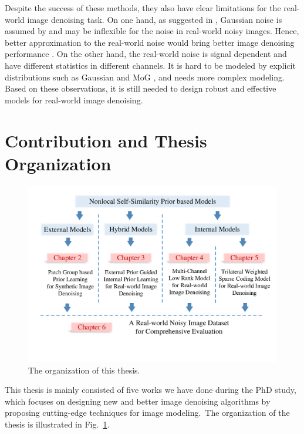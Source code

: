 Despite the success of these methods, they also have clear limitations for the real-world image denoising task. On one hand, as suggested in \cite{Liu2008,noiseclinic}, Gaussian noise is assumed by \cite{fullyblind,rabie2005robust,Liu2008} and may be inflexible for the noise in real-world noisy images. Hence, better approximation to the real-world noise would bring better image denoising performance \cite{Liu2008,noiseclinic}. On the other hand, the real-world noise is signal dependent and have different statistics in different channels. It is hard to be modeled by explicit distributions such as Gaussian and MoG \cite{Liu2008,Leungtip,crosschannel2016,karaimer_brown_ECCV_2016,dnd2017}, and needs more complex modeling. Based on these observations, it is still needed to design robust and effective models for real-world image denoising.


\section{Contribution and Thesis Organization}
\label{sec:intro:new}

\begin{figure}[t!]
\centering
\includegraphics[width=1\linewidth]{images/ThesisOrganization.pdf}
\vspace{-20mm}
\caption{The organization of this thesis.}
\label{fig1-1}
\end{figure}

This thesis is mainly consisted of five works we have done during the PhD study, which focuses on designing new and better image denoising algorithms by proposing cutting-edge techniques for image modeling.\ The organization of the thesis is illustrated in Fig.\ \ref{fig1-1}.

